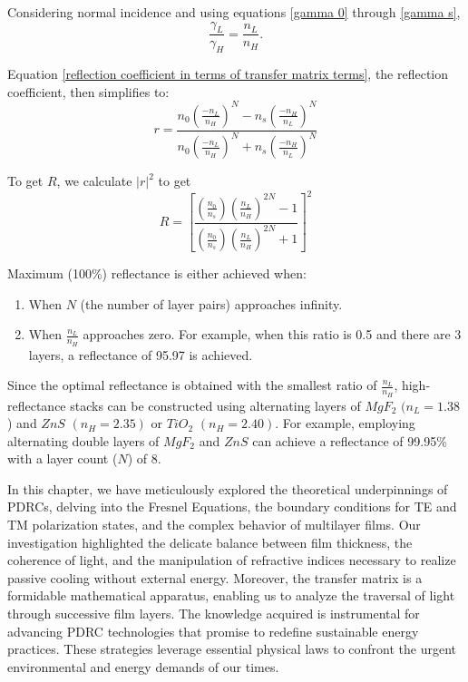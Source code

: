 Considering normal incidence and using equations \ref{gamma 0} through \ref{gamma s},
\begin{equation}
    \frac{\gamma_L}{\gamma_H} = \frac{n_L}{n_H}.
\end{equation}

Equation \ref{reflection coefficient in terms of transfer matrix terms}, the reflection coefficient, then simplifies to:
    \begin{equation}\label{reflection coefficient for double high-reflectance layers}
    r = \frac{n_0\left(\frac{-n_L}{n_H}\right)^N - n_s\left(\frac{-n_H}{n_L}\right)^N}{n_0\left(\frac{-n_L}{n_H}\right)^N + n_s\left(\frac{-n_H}{n_L}\right)^N}
    \end{equation}

To get $R$, we calculate $|r|^2$ to get
    \begin{equation}\label{maximum reflectance equation}
    R = \left[ \frac{ \left( \frac{n_0}{n_s} \right) \left( \frac{n_L}{n_H} \right)^{2N}  - 1 }{  \left( \frac{n_0}{n_s} \right) \left( \frac{n_L}{n_H} \right)^{2N}  + 1     }  \right]^2
    \end{equation}

Maximum (100\%) reflectance is either achieved when:
    \begin{enumerate}
      \item When $N$ (the number of layer pairs) approaches infinity.
      \item When $\frac{n_L}{n_H}$ approaches zero. For example, when this ratio is 0.5 and there are 3 layers, a reflectance of 95.97 is achieved.
    \end{enumerate}
Since the optimal reflectance is obtained with the smallest ratio of $\frac{n_L}{n_H}$, high-reflectance stacks can be constructed using alternating layers of $MgF_2$ $(n_L = 1.38$) and $ZnS$ $(n_H = 2.35)$ or $TiO_2$ $(n_H = 2.40)$. For example, employing alternating double layers of $MgF_2$ and $ZnS$ can achieve a reflectance of 99.95\% with a layer count ($N$) of 8.

In this chapter, we have meticulously explored the theoretical underpinnings of PDRCs, delving into the Fresnel Equations, the boundary conditions for TE and TM polarization states, and the complex behavior of multilayer films. Our investigation highlighted the delicate balance between film thickness, the coherence of light, and the manipulation of refractive indices necessary to realize passive cooling without external energy. Moreover, the transfer matrix is a formidable mathematical apparatus, enabling us to analyze the traversal of light through successive film layers. The knowledge acquired is instrumental for advancing PDRC technologies that promise to redefine sustainable energy practices. These strategies leverage essential physical laws to confront the urgent environmental and energy demands of our times.
